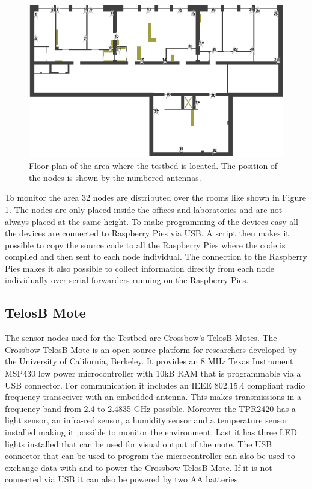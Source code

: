 \begin{figure}[htbp]
	\centering
    \includegraphics[scale=0.75]{content/images/Testbed}
   	\caption{Floor plan of the area where the testbed is located. The position of the nodes is shown by the numbered antennas.}
    \label{fig:testbed}
\end{figure}

To monitor the area 32 nodes are distributed over the rooms like shown in Figure \ref{fig:testbed}. The nodes are only placed inside the offices and laboratories and are not always placed at the same height. To make programming of the devices easy all the devices are connected to Raspberry Pies via USB. A script then makes it possible to copy the source code to all the Raspberry Pies where the code is compiled and then sent to each node individual. The connection to the Raspberry Pies makes it also possible to collect information directly from each node individually over serial forwarders running on the Raspberry Pies.

\subsection{TelosB Mote}
\label{chp:TelosB}
The sensor nodes used for the Testbed are Crossbow's TelosB Motes. The Crossbow TelosB Mote is an open source platform for researchers developed by the University of California, Berkeley. It provides an 8 MHz Texas Instrument MSP430 low power microcontroller with 10kB RAM that is programmable via a USB connector. For communication it includes an IEEE 802.15.4 compliant radio frequency transceiver with an embedded antenna. This makes transmissions in a frequency band from 2.4 to 2.4835 GHz possible. Moreover the TPR2420 has a light sensor, an infra-red sensor, a humidity sensor and a temperature sensor installed making it possible to monitor the environment. Last it has three LED lights installed that can be used for visual output of the mote. The USB connector that can be used to program the microcontroller can also be used to exchange data with and to power the Crossbow TelosB Mote. If it is not connected via USB it can also be powered by two AA batteries. \cite{Telosb}


